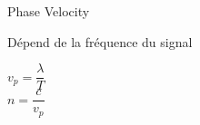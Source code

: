 \begin{frame}{Phase Velocity}
    \begin{twocolumns}[0.33]
        \leftcol
        \begin{makelist}[\small][1.5]
            \icon{\faStumbleupon} Dépend de la fréquence du signal
        \end{makelist}

        \begin{center}
            $v_p = \dfrac{\lambda}{T}$\\
            \vspace{6pt}
            $n = \dfrac{c}{v_p}$
        \end{center}

        \rightcol
    \end{twocolumns}
\end{frame}


